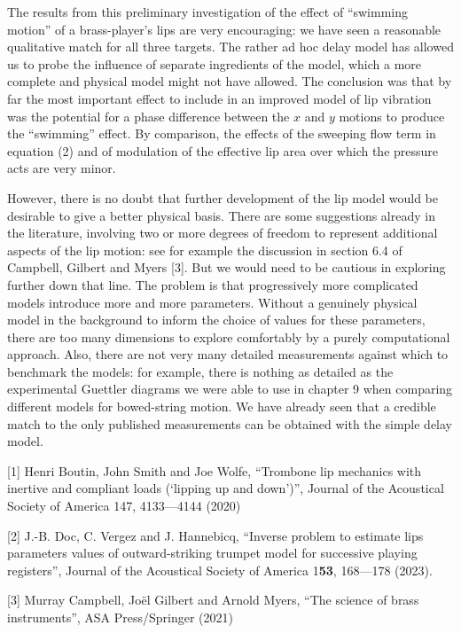   The results from this preliminary investigation of the effect of ``swimming 
  motion'' of a brass-player's lips are very encouraging: we have seen a 
  reasonable qualitative match for all three targets. The rather ad hoc delay 
  model has allowed us to probe the influence of separate ingredients of the 
  model, which a more complete and physical model might not have allowed. The 
  conclusion was that by far the most important effect to include in an 
  improved model of lip vibration was the potential for a phase difference 
  between the $x$ and $y$ motions to produce the ``swimming'' effect. By 
  comparison, the effects of the sweeping flow term in equation (2) and of 
  modulation of the effective lip area over which the pressure acts are very 
  minor. 

  However, there is no doubt that further development of the lip model would be 
  desirable to give a better physical basis. There are some suggestions already 
  in the literature, involving two or more degrees of freedom to represent 
  additional aspects of the lip motion: see for example the discussion in 
  section 6.4 of Campbell, Gilbert and Myers [3]. But we would need to be 
  cautious in exploring further down that line. The problem is that 
  progressively more complicated models introduce more and more parameters. 
  Without a genuinely physical model in the background to inform the choice of 
  values for these parameters, there are too many dimensions to explore 
  comfortably by a purely computational approach. Also, there are not very many 
  detailed measurements against which to benchmark the models: for example, 
  there is nothing as detailed as the experimental Guettler diagrams we were 
  able to use in chapter 9 when comparing different models for bowed-string 
  motion. We have already seen that a credible match to the only published 
  measurements can be obtained with the simple delay model. 

  \sectionreferences{}[1] Henri Boutin, John Smith and Joe Wolfe, “Trombone lip 
  mechanics with inertive and compliant loads (‘lipping up and down’)”, Journal 
  of the Acoustical Society of America 147, 4133—4144 (2020) 

  [2] J.-B. Doc, C. Vergez and J. Hannebicq, “Inverse problem to estimate lips 
  parameters values of outward-striking trumpet model for successive playing 
  registers”, Journal of the Acoustical Society of America 1\textbf{53}, 
  168—178 (2023). 

  [3] Murray Campbell, Joël Gilbert and Arnold Myers, “The science of brass 
  instruments”, ASA Press/Springer (2021) 